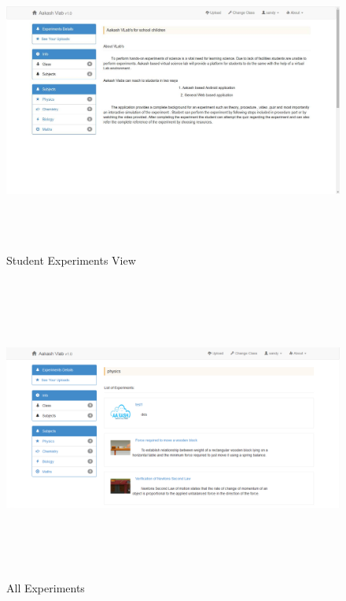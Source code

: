 \documentclass[12pt]{report}
\begin{document}
\begin{figure}[H]
 \centering 
 \includegraphics[width=15cm, height=10cm]{./303.jpg}
 \caption{Student Experiments View\label{fig:303}}
\end{figure}
\begin{figure}[H]
 \centering 
 \includegraphics[width=15cm, height=10cm]{./304.jpg}
 \caption{All Experiments\label{fig:304}}
\end{figure}
\end{document}
